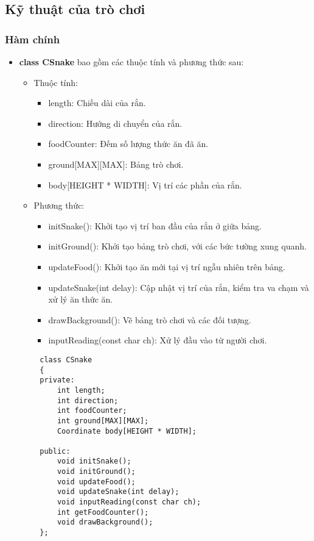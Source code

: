 \documentclass[a4paper, 12pt]{article}
\begin{document}
\subsection{Kỹ thuật của trò chơi}
\subsubsection{Hàm chính}
\begin{center}
    \begin{itemize}
        \item \textbf{class CSnake} bao gồm các thuộc tính và phương thức sau:
        \begin{itemize}
            \item Thuộc tính:
            \begin{itemize}
                \item length: Chiều dài của rắn.
                \item direction: Hướng di chuyển của rắn.
                \item foodCounter: Đếm số lượng thức ăn đã ăn.
                \item ground[MAX][MAX]: Bảng trò chơi.
                \item body[HEIGHT * WIDTH]: Vị trí các phần của rắn.
            \end{itemize}
        \end{itemize}
        \begin{itemize}
            \item Phương thức:
            \begin{itemize}
                \item initSnake(): Khởi tạo vị trí ban đầu của rắn ở giữa bảng.
                \item initGround(): Khởi tạo bảng trò chơi, với các bức tường xung quanh.
                \item updateFood(): Khởi tạo ăn mới tại vị trí ngẫu nhiên trên bảng.
                \item updateSnake(int delay): Cập nhật vị trí của rắn, kiểm tra va chạm và xử lý ăn thức ăn.
                \item drawBackground(): Vẽ bảng trò chơi và các đối tượng.
                \item inputReading(const char ch): Xử lý đầu vào từ người chơi.
            \end{itemize}
        \end{itemize}
    \end{itemize}
    
    \begin{lstlisting}
        class CSnake
        {
        private:
            int length;
            int direction;
            int foodCounter;
            int ground[MAX][MAX];
            Coordinate body[HEIGHT * WIDTH];
        
        public:
            void initSnake();
            void initGround();
            void updateFood();
            void updateSnake(int delay);
            void inputReading(const char ch);
            int getFoodCounter();
            void drawBackground();
        };
    \end{lstlisting}
\end{center}
\end{document}
